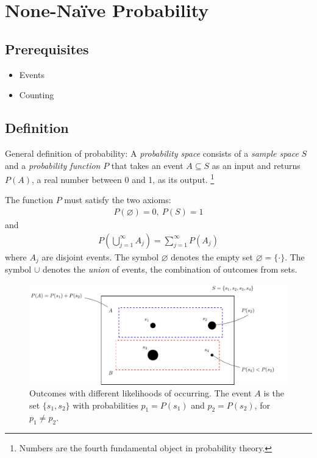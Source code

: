 


\maketitle
\clearpage

\section{None-Naïve Probability}

\subsection{Prerequisites}

\begin{itemize}
\item Events
\item Counting
\end{itemize}

\subsection{Definition}

General definition of probability: 
A \emph{probability space} consists of a \emph{sample space} \(S\) 
and a \emph{probability function} \(P\) 
that takes an event \(A \subseteq S\) as an input and returns \(P(A)\), 
a real number between 0 and 1, as its output.%
\footnote{Numbers are the fourth fundamental object in probability theory.} 

The function \(P\) must satisfy the two axioms:
\begin{align}
P(\varnothing) = 0,\ P(S) = 1
\end{align}
and
\begin{align}
P\left( \bigcup_{j = 1}^{\infty}A_{j} \right) = \sum_{j = 1}^{\infty}{P(A_{j})}
\end{align}
where \(A_{j}\) are disjoint events.
The symbol \(\varnothing\) denotes the empty set \(\varnothing=\{\cdot\}\). 
The symbol \(\cup\) denotes the \emph{union} of events, 
the combination of outcomes from sets.

\begin{figure}[h!]
\centering
\includegraphics[width=0.9\linewidth]{tikz/figure1.pdf}
\caption{%
Outcomes with different likelihoods of occurring.
The event \(A\) is the set \(\{s_1, s_2\}\) with probabilities \(p_1=P(s_1)\) and
\(p_2=P(s_2)\),
for \(p_1 \neq p_2\).
}
\label{fig:outcomes}
\end{figure}

